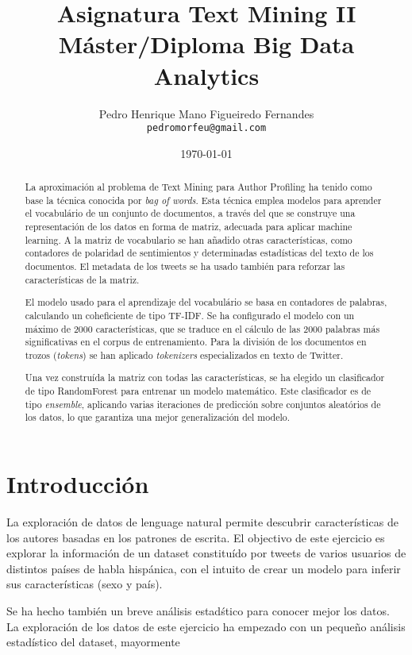\documentclass[11pt,a4paper]{article}
\title{Asignatura Text Mining II\\
M\'aster/Diploma Big Data Analytics}
\author{Pedro Henrique Mano Figueiredo Fernandes \\
  {\tt pedromorfeu@gmail.com} \\}
\date{\today}
\begin{document}
\maketitle
\begin{abstract}
  
  La aproximaci\'on al problema de Text Mining para Author Profiling ha tenido como base la t\'ecnica conocida por {\em bag of words}. Esta t\'ecnica emplea modelos para aprender el vocabul\'ario de un conjunto de documentos, a trav\'es del que se construye una representaci\'on de los datos en forma de matriz, adecuada para aplicar machine learning. A la matriz de vocabulario se han a\~nadido otras caracter\'isticas, como contadores de polaridad de sentimientos y determinadas estad\'isticas del texto de los documentos. El metadata de los tweets se ha usado también para reforzar las caracter\'isticas de la matriz.
  
  El modelo usado para el aprendizaje del vocabul\'ario se basa en contadores de palabras, calculando un coheficiente de tipo TF-IDF. Se ha configurado el modelo con un máximo de 2000 caracter\'isticas, que se traduce en el c\'alculo de las 2000 palabras más significativas en el corpus de entrenamiento. Para la divisi\'on de los documentos en trozos ({\em tokens}) se han aplicado {\em tokenizers} especializados en texto de Twitter.
  
  Una vez constru\'ida la matriz con todas las caracter\'isticas, se ha elegido un clasificador de tipo RandomForest para entrenar un modelo matem\'atico. Este clasificador es de tipo {\em ensemble}, aplicando varias iteraciones de predicci\'on sobre conjuntos aleat\'orios de los datos, lo que garantiza una mejor generalizaci\'on del modelo.

\end{abstract}


\section{Introducci\'on}

  La exploraci\'on de datos de lenguage natural permite descubrir características de los autores basadas en los patrones de escrita. El objectivo de este ejercicio es explorar la informaci\'on de un dataset constitu\'ido por tweets de varios usuarios de distintos pa\'ises de habla hisp\'anica, con el intuito de crear un modelo para inferir sus características (sexo y pa\'is).
  
  Se ha hecho tambi\'en un breve an\'alisis estad\'stico para conocer mejor los datos. \\
  La exploraci\'on de los datos de este ejercicio ha empezado con un pequeño an\'alisis estad\'istico del dataset, mayormente 
\end{document}
